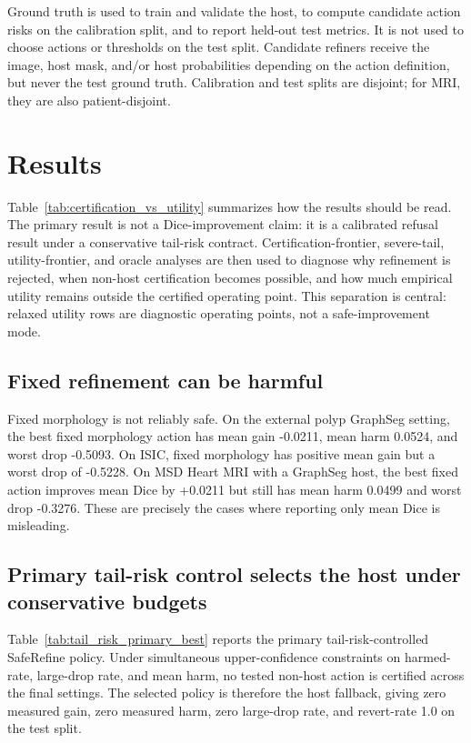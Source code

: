 \documentclass[preprint,12pt]{elsarticle}
\begin{document}
Ground truth is used to train and validate the host, to compute candidate
action risks on the calibration split, and to report held-out test metrics. It
is not used to choose actions or thresholds on the test split. Candidate
refiners receive the image, host mask, and/or host probabilities depending on
the action definition, but never the test ground truth. Calibration and test
splits are disjoint; for MRI, they are also patient-disjoint.

\section{Results}

Table~\ref{tab:certification_vs_utility} summarizes how the results should be
read. The primary result is not a Dice-improvement claim: it is a calibrated
refusal result under a conservative tail-risk contract. Certification-frontier,
severe-tail, utility-frontier, and oracle analyses are then used to diagnose
why refinement is rejected, when non-host certification becomes possible, and
how much empirical utility remains outside the certified operating point. This
separation is central: relaxed utility rows are diagnostic operating points, not
a safe-improvement mode.



\subsection{Fixed refinement can be harmful}

Fixed morphology is not reliably safe. On the external polyp GraphSeg setting,
the best fixed morphology action has mean gain -0.0211, mean harm 0.0524, and
worst drop -0.5093. On ISIC, fixed morphology has positive mean gain but a
worst drop of -0.5228. On MSD Heart MRI with a GraphSeg host, the best fixed
action improves mean Dice by +0.0211 but still has mean harm 0.0499 and worst
drop -0.3276. These are precisely the cases where reporting only mean Dice is
misleading.

\subsection{Primary tail-risk control selects the host under conservative budgets}

Table~\ref{tab:tail_risk_primary_best} reports the primary tail-risk-controlled
SafeRefine policy. Under simultaneous upper-confidence constraints on
harmed-rate, large-drop rate, and mean harm, no tested non-host action is
certified across the final settings. The selected policy is therefore the host
fallback, giving zero measured gain, zero measured harm, zero large-drop rate,
and revert-rate 1.0 on the test split.
\end{document}
